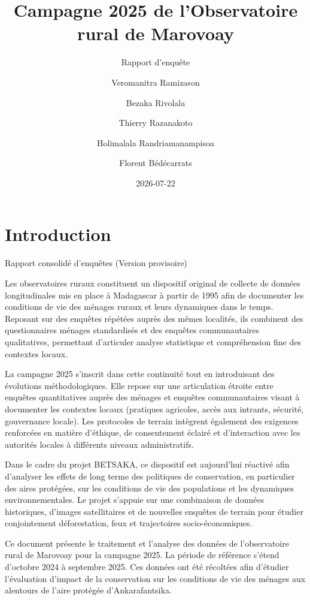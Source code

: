 \documentclass[
  french,
  letterpaper,
]{report}
\title{Campagne 2025 de l'Observatoire rural de Marovoay}
\subtitle{Rapport d'enquête}
\author{Veromanitra Ramizason \and Bezaka Rivolala \and Thierry
Razanakoto \and Holimalala Randriamanampisoa \and Florent Bédécarrats}
\date{2026-07-22}
\renewcommand*\contentsname{Table des matières}
\newcommand\contentsname{Table des matières}
\begin{document}
\maketitle

\renewcommand*\contentsname{Table des matières}
{
\setcounter{tocdepth}{2}
\tableofcontents
}


\chapter*{Introduction}\label{introduction}


Rapport consolidé d'enquêtes (Version provisoire)

\hfill\break

Les observatoires ruraux constituent un dispositif original de collecte
de données longitudinales mis en place à Madagascar à partir de 1995
afin de documenter les conditions de vie des ménages ruraux et leurs
dynamiques dans le temps. Reposant sur des enquêtes répétées auprès des
mêmes localités, ils combinent des questionnaires ménages standardisés
et des enquêtes communautaires qualitatives, permettant d'articuler
analyse statistique et compréhension fine des contextes locaux.

La campagne 2025 s'inscrit dans cette continuité tout en introduisant
des évolutions méthodologiques. Elle repose sur une articulation étroite
entre enquêtes quantitatives auprès des ménages et enquêtes
communautaires visant à documenter les contextes locaux (pratiques
agricoles, accès aux intrants, sécurité, gouvernance locale). Les
protocoles de terrain intègrent également des exigences renforcées en
matière d'éthique, de consentement éclairé et d'interaction avec les
autorités locales à différents niveaux administratifs.

Dans le cadre du projet BETSAKA, ce dispositif est aujourd'hui réactivé
afin d'analyser les effets de long terme des politiques de conservation,
en particulier des aires protégées, sur les conditions de vie des
populations et les dynamiques environnementales. Le projet s'appuie sur
une combinaison de données historiques, d'images satellitaires et de
nouvelles enquêtes de terrain pour étudier conjointement déforestation,
feux et trajectoires socio-économiques.

Ce document présente le traitement et l'analyse des données de
l'observatoire rural de Marovoay pour la campagne 2025. La période de
référence s'étend d'octobre 2024 à septembre 2025. Ces données ont été
récoltées afin d'étudier l'évaluation d'impact de la conservation sur
les conditions de vie des ménages aux alentours de l'aire protégée
d'Ankarafantsika.
\end{document}
